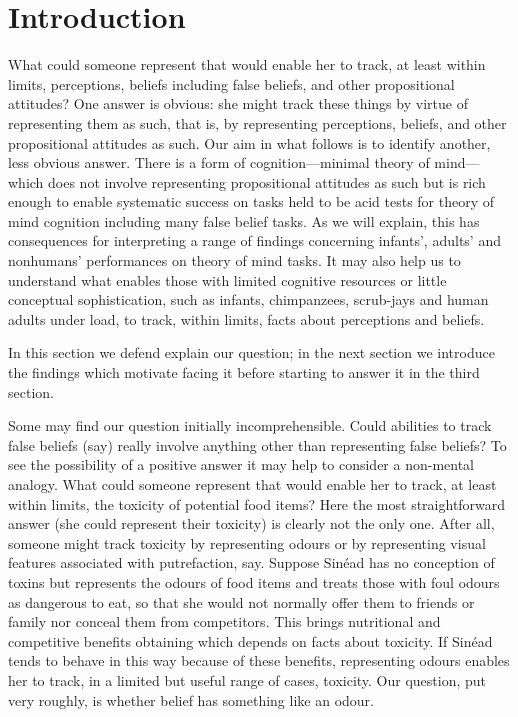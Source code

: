 \documentclass[12pt,\papersize]{extarticle}
\begin{document}
\section{Introduction}
What could someone represent that would enable her to track, at least within limits, perceptions, beliefs including false beliefs, and other propositional attitudes? 
One answer is obvious: she might track these things by virtue of representing them as such, that is, by representing perceptions, beliefs, and other propositional attitudes as such.
Our aim in what follows is to identify another, less obvious answer.
There is a form of cognition---minimal theory of mind---which does not involve representing propositional attitudes as such but is  rich enough to enable systematic success on tasks held to be acid tests for theory of mind cognition including many false belief tasks.
As we will explain, this has consequences 
for interpreting a range of findings concerning infants', adults' and nonhumans' performances on theory of mind tasks.
It may also help us to understand what enables those with limited cognitive resources or little conceptual sophistication, such as infants, chimpanzees, scrub-jays and human adults under load, to track, within limits, facts about perceptions and beliefs.

In this section we defend explain our question; in the next section we introduce the findings which motivate facing it before starting to answer it in the third section.

Some may find our question initially incomprehensible.
Could abilities to track false beliefs (say) really involve anything other than representing false beliefs?
To see the possibility of a positive answer it may help to consider a non-mental analogy.
What could someone represent that would enable her to track, at least within limits, the toxicity of potential food items?
Here the most straightforward answer (she could represent their toxicity) is clearly not the only one.
After all, someone might track toxicity by representing odours or by representing visual features associated with putrefaction, say.
Suppose Sin\'ead has no conception of toxins but represents the odours of food items and 
treats those with foul odours as dangerous to eat,
so that she would not normally offer them to friends or family
nor conceal them from competitors.
This brings nutritional and competitive benefits obtaining which depends on facts about toxicity.
If Sin\'ead tends to behave in this way because of these benefits, 
representing odours enables her to track, in a limited but useful range of cases,  toxicity.
Our question, put very roughly, is whether   belief has something like an odour.
\end{document}
